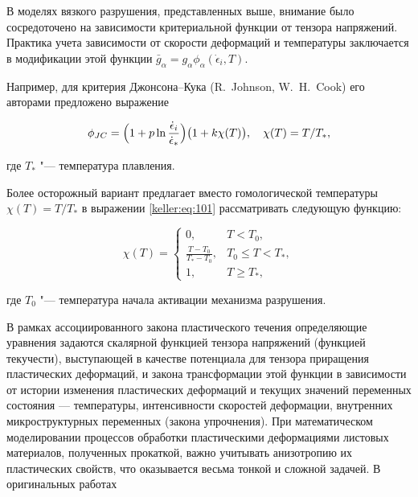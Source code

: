 В моделях вязкого разрушения, представленных выше, внимание было сосредоточено на зависимости критериальной функции от тензора напряжений. Практика учета зависимости от скорости деформаций и температуры заключается в модификации этой функции  $\bar{g}_{\alpha}=g_{\alpha}\phi_{\alpha}(\dot{\epsilon}_i,T).$ 

Например, для критерия Джонсона--Кука (R.~Johnson, W.~H.~Cook) его авторами \cite{keller:bib:john} предложено выражение

\begin{equation}\label{keller:eq:101}

	\phi_{JC}=\Bigl(1+p\ln\frac{\dot{\epsilon}_i}{\dot{\epsilon}_{\ast}}\Bigr)\bigl(1+k\chi(T)\bigr), \quad \chi(T) = {T}/{T_{\ast}},

\end{equation}

где $T_{\ast}$ "--- температура плавления. 

Более осторожный вариант  предлагает вместо гомологической температуры $\chi(T)=T/T_{\ast}$ в выражении \eqref{keller:eq:101} рассматривать следующую функцию: 

$$

\chi(T)= \left\{ 

\begin{array}{cc}

0,& T<T_0,\\ 

\frac{T-T_0}{T_{\ast}-T_0},& T_0\leq T<T_{\ast},\\ 

1,& T\geq T_{\ast},

\end{array}

\right.

$$ 

где $T_{0}$ "--- температура начала активации механизма разрушения.



\newpage




В рамках ассоциированного закона пластического течения определяющие уравнения задаются скалярной функцией тензора напряжений (функцией текучести), выступающей в качестве потенциала для тензора приращения пластических деформаций, и закона трансформации этой функции в зависимости от истории изменения пластических деформаций и текущих значений переменных состояния --- температуры, интенсивности скоростей деформации, внутренних микроструктурных переменных (закона упрочнения). При математическом моделировании процессов обработки пластическими деформациями листовых материалов, полученных прокаткой, важно учитывать анизотропию их пластических свойств, что оказывается весьма тонкой и сложной задачей. В оригинальных работах 

